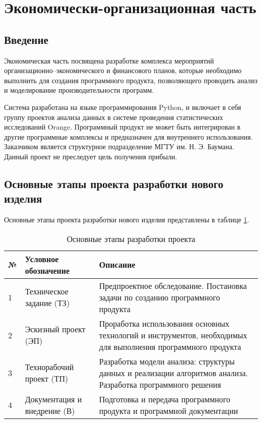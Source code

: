 \section{Экономически-организационная часть}
\subsection{Введение}
Экономическая часть посвящена разработке комплекса мероприятий организационно–экономического и финансового планов, которые необходимо выполнить для создания программного продукта, позволяющего проводить анализ и моделирование производительности программ.

Система разработана на языке программирования Python, и включает в себя группу проектов анализа данных в системе проведения статистических исследований Orange. Программный продукт не может быть интегрирован в другие программные комплексы и предназначен для внутреннего использования. Заказчиком является структурное подразделение МГТУ им. Н. Э. Баумана.
Данный проект не преследует цель получения прибыли.

\subsection{Основные этапы проекта разработки нового изделия}
Основные этапы проекта разработки нового изделия представлены в таблице \ref{tab:development-stages}.

\begin{table}[H]
    \caption{\label{tab:development-stages}Основные этапы разработки проекта}
    \begin{tabular}[H]{|l|p{5cm}|p{8cm}|}
        \hline
        № & Условное обозначение & Описание\\
        \hline
        1 & Техническое задание (ТЗ) & Предпроектное обследование. Постановка задачи по созданию программного продукта\\
        \hline
        2 & Эскизный проект (ЭП) & Проработка использования основных технологий и инструментов, необходимых для выполнения программного продукта\\
        \hline
        3 & Технорабочий проект (ТП) & Разработка модели анализа: структуры данных и реализации алгоритмов анализа. Разработка программного решения\\
        \hline
        4 & Документация и внедрение (В) & Подготовка и передача программного продукта и программной документации\\
        \hline
    \end{tabular}
\end{table}

